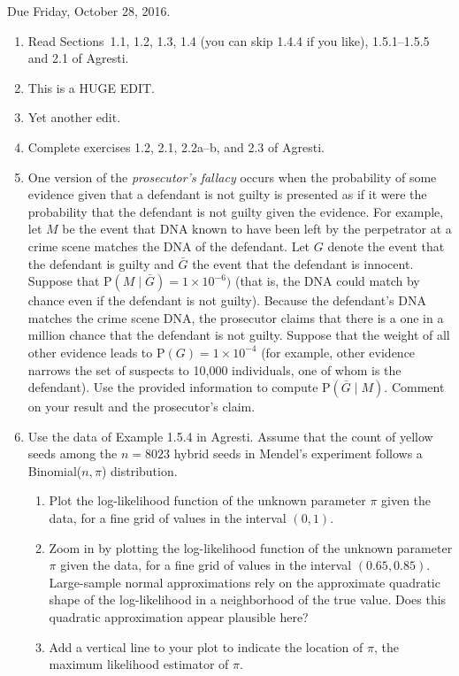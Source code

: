 \documentclass[12pt,epsf]{article}
\begin{document}

Due Friday, October 28, 2016.




\begin{enumerate}

\item Read Sections~1.1, 1.2, 1.3, 1.4 (you can skip 1.4.4 if you like), 1.5.1--1.5.5 and 2.1 of Agresti.

\item This is a HUGE EDIT.
\item Yet another edit.

\item Complete exercises 1.2, 2.1, 2.2a--b, and 2.3 of Agresti.

\item One version of the {\em prosecutor's fallacy} occurs when the probability of some evidence given that a defendant is not guilty is presented as if it were the probability that the defendant is not guilty given the evidence.  For example, let $M$ be the event that DNA known to have been left by the perpetrator at a crime scene matches the DNA of the defendant. Let $G$ denote the event that the defendant is guilty and $\bar G$ the event that the defendant is innocent.  Suppose that P$(M\mid\bar G)=1\times 10^{-6})$ (that is, the DNA could match by chance even if the defendant is not guilty).  Because the defendant's DNA matches the crime scene DNA, the prosecutor claims that there is a one in a million chance that the defendant is not guilty.  Suppose that the weight of all other evidence leads to P$(G)=1\times 10^{-4}$ (for example, other evidence narrows the set of suspects to 10,000 individuals, one of whom is the defendant).  Use the provided information to compute P$(\bar G\mid M)$.  Comment on your result and the prosecutor's claim.


 \item Use the data of Example 1.5.4 in Agresti.  Assume that the count of yellow seeds among the $n=8023$ hybrid seeds in Mendel's experiment follows a Binomial($n,\pi$) distribution.
     \begin{enumerate}
     \item Plot the log-likelihood function of the unknown parameter $\pi$ given the data, for a fine grid of values in the interval $(0,1)$.
     \item Zoom in by plotting the log-likelihood function of the unknown parameter $\pi$ given the data, for a fine grid of values in the interval $(0.65,0.85)$.  Large-sample normal approximations rely on the approximate quadratic shape of the log-likelihood in a neighborhood of the true value.  Does this quadratic approximation appear plausible here?
     \item Add a vertical line to your plot to indicate the location of $\widehat\pi$, the maximum likelihood estimator of $\pi$.


\end{enumerate}
\end{enumerate}
\end{document}
